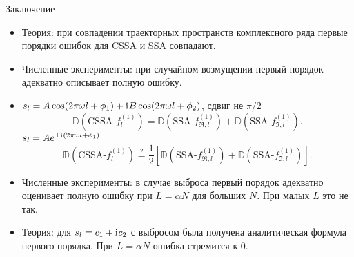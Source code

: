 \documentclass[ucs, notheorems, handout]{beamer}
\newcommand{\iu}{\mathrm{i}\mkern1mu}
\begin{document}
\begin{frame}{Заключение}
    \begin{itemize}
        \item Теория: при совпадении траекторных пространств комплексного ряда первые порядки ошибок для CSSA и SSA совпадают.
        \item Численные эксперименты: при случайном возмущении первый порядок адекватно описывает полную ошибку.
        \item $s_l = A\cos(2 \pi\omega l + \phi_1) + \iu B\cos(2 \pi\omega l + \phi_2)$, сдвиг не $\pi / 2$
        $$\mathbb{D}(\text{CSSA-}f^{(1)}_l) = \mathbb{D}(\text{SSA-}f^{(1)}_{\Re, l}) + \mathbb{D}(\text{SSA-}f^{(1)}_{\Im, l}).$$
        $s_l = Ae^{\pm \iu(2 \pi\omega l + \phi_1)}$
        $$\mathbb{D}(\text{CSSA-}f^{(1)}_l) \stackrel{?}{=} \frac{1}{2}[\mathbb{D}(\text{SSA-}f^{(1)}_{\Re, l}) + \mathbb{D}(\text{SSA-}f^{(1)}_{\Im, l})].$$
        \item Численные эксперименты: в случае выброса первый порядок адекватно оценивает полную ошибку при $L = \alpha N$ для больших $N$. При малых $L$ это не так.
        \item Теория: для $s_l = c_1 + \iu c_2$ с выбросом была получена аналитическая формула первого порядка. При $L = \alpha N$ ошибка стремится к $0$.
    \end{itemize}
    
\end{frame}
\end{document}
